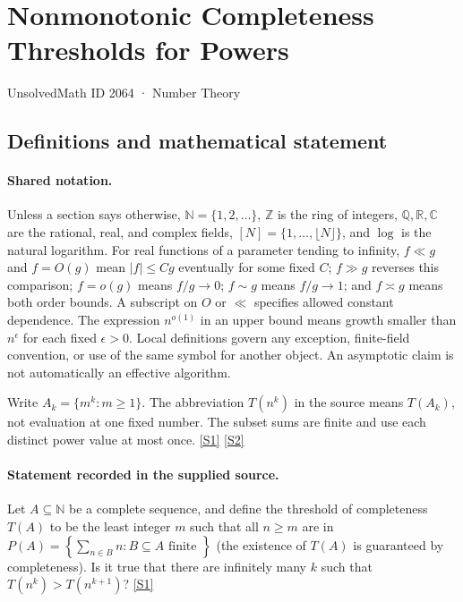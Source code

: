 \documentclass[11pt,a4paper]{article}
\newcommand{\N}{\mathbb{N}}
\newcommand{\Z}{\mathbb{Z}}
\newcommand{\Q}{\mathbb{Q}}
\newcommand{\R}{\mathbb{R}}
\newcommand{\C}{\mathbb{C}}
\newcommand{\sref}[2]{\hyperlink{source:#1:#2}{[S#2]}}
\begin{document}

\setcounter{section}{2063}

\section{Nonmonotonic Completeness Thresholds for Powers}\label{2064}

{\small\sffamily UnsolvedMath ID 2064 · Number Theory}

\subsection{Definitions and mathematical statement}

\paragraph{Shared notation.}Unless a section says otherwise, $\N=\{1,2,\ldots\}$,
$\Z$ is the ring of integers, $\Q,\R,\C$ are the rational, real, and complex
fields, $[N]=\{1,\ldots,\lfloor N\rfloor\}$, and $\log$ is the natural
logarithm. For real functions of a parameter tending to infinity,
$f\ll g$ and $f=O(g)$ mean $|f|\leq Cg$ eventually for some fixed $C$;
$f\gg g$ reverses this comparison; $f=o(g)$ means $f/g\to0$;
$f\sim g$ means $f/g\to1$; and $f\asymp g$ means both order bounds.
A subscript on $O$ or $\ll$ specifies allowed constant dependence.
The expression $n^{o(1)}$ in an upper bound means growth smaller than
$n^\epsilon$ for each fixed $\epsilon>0$. Local definitions govern any
exception, finite-field convention, or use of the same symbol for another
object. An asymptotic claim is not automatically an effective algorithm.



Write $A_k=\{m^k:m\geq1\}$. The abbreviation $T(n^k)$ in the source means $T(A_k)$, not evaluation at one fixed number. The subset sums are finite and use each distinct power value at most once. \sref{2064}{1} \sref{2064}{2}

\paragraph{Statement recorded in the supplied source.}
Let $A\subseteq \mathbb{N}$ be a complete sequence, and define the threshold of completeness $T(A)$ to be the least integer $m$ such that all $n\geq m$ are in $ P(A) = \left\{\sum_{n\in B}n : B\subseteq A\textrm{ finite }\right\} $ (the existence of $T(A)$ is guaranteed by completeness).
Is it true that there are infinitely many $k$ such that $T(n^k)>T(n^{k+1})$? \sref{2064}{1}
\end{document}
